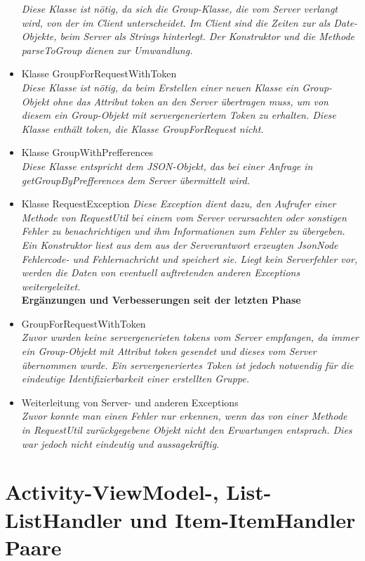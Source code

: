 \documentclass[a4paper]{scrreprt}
\begin{document}
\begin{itemize}
\textit{Diese Klasse ist nötig, da sich die Group-Klasse, die vom Server verlangt wird, von der im Client unterscheidet. Im Client sind die Zeiten zur als Date-Objekte, beim Server als Strings hinterlegt. Der Konstruktor und die Methode parseToGroup dienen zur Umwandlung.}
\item Klasse GroupForRequestWithToken \\
\textit{Diese Klasse ist nötig, da beim Erstellen einer neuen Klasse ein Group-Objekt ohne das Attribut token an den Server übertragen muss, um von diesem ein Group-Objekt mit servergeneriertem Token zu erhalten. Diese Klasse enthält token, die Klasse GroupForRequest nicht.   }
\item Klasse GroupWithPrefferences \\
\textit{Diese Klasse entspricht dem JSON-Objekt, das bei einer Anfrage in getGroupByPrefferences dem Server übermittelt wird.}
\item Klasse RequestException
\textit{Diese Exception dient dazu, den Aufrufer einer Methode von RequestUtil bei einem vom Server verursachten oder sonstigen Fehler zu benachrichtigen und ihm Informationen zum Fehler zu übergeben. Ein Konstruktor liest aus dem aus der Serverantwort erzeugten JsonNode Fehlercode- und Fehlernachricht und speichert sie. Liegt kein Serverfehler vor, werden die Daten von eventuell auftretenden anderen Exceptions weitergeleitet. } \\

\textbf{Ergänzungen und Verbesserungen seit der letzten Phase}

\item GroupForRequestWithToken \\
\textit{Zuvor wurden keine servergenerieten tokens vom Server empfangen, da immer ein Group-Objekt mit Attribut token gesendet und dieses vom Server übernommen wurde. Ein servergeneriertes Token ist jedoch notwendig für die eindeutige Identifizierbarkeit einer erstellten Gruppe. }
\item Weiterleitung von Server- und anderen Exceptions \\
\textit{Zuvor konnte man einen Fehler nur erkennen, wenn das von einer Methode in RequestUtil zurückgegebene Objekt nicht den Erwartungen entsprach. Dies war jedoch nicht eindeutig und aussagekräftig.}

\end{itemize}

\section{Activity-ViewModel-, List-ListHandler und Item-ItemHandler Paare}
\end{document}
